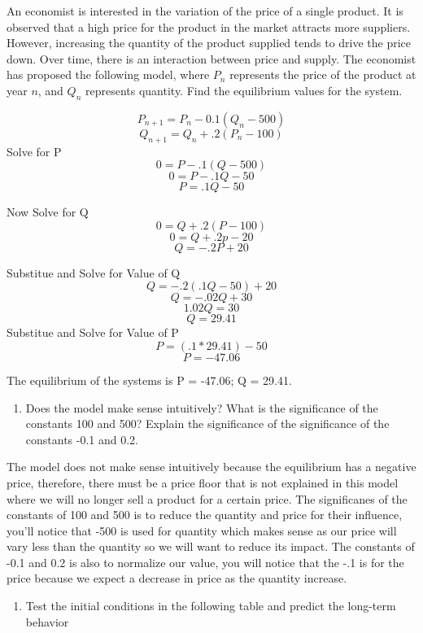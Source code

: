 \documentclass[]{article}
\providecommand{\tightlist}{%
  \setlength{\itemsep}{0pt}\setlength{\parskip}{0pt}}
\begin{document}
An economist is interested in the variation of the price of a single
product. It is observed that a high price for the product in the market
attracts more suppliers. However, increasing the quantity of the product
supplied tends to drive the price down. Over time, there is an
interaction between price and supply. The economist has proposed the
following model, where \(P_n\) represents the price of the product at
year \(n\), and \(Q_n\) represents quantity. Find the equilibrium values
for the system.

\[P_{n+1} = P_n - 0.1(Q_n -500)\] \[Q_{n+1} = Q_n + .2(P_n - 100)\]
Solve for P \[0 = P-.1(Q - 500)\] \[0 = P-.1Q - 50\] \[P = .1Q -50 \]

Now Solve for Q \[0 = Q + .2(P - 100)\] \[0 = Q +.2p-20\]
\[Q = -.2P+20\]

Substitue and Solve for Value of Q \[Q = -.2(.1Q - 50)+20\]
\[Q = -.02Q + 30\] \[1.02Q = 30\] \[Q = 29.41\] Substitue and Solve for
Value of P \[P = (.1*29.41) -50 \] \[P = -47.06\]

The equilibrium of the systems is P = -47.06; Q = 29.41.

\begin{enumerate}
\def\labelenumi{\alph{enumi}.}
\tightlist
\item
  Does the model make sense intuitively? What is the significance of the
  constants 100 and 500? Explain the significance of the significance of
  the constants -0.1 and 0.2.
\end{enumerate}

The model does not make sense intuitively because the equilibrium has a
negative price, therefore, there must be a price floor that is not
explained in this model where we will no longer sell a product for a
certain price. The significanes of the constants of 100 and 500 is to
reduce the quantity and price for their influence, you'll notice that
-500 is used for quantity which makes sense as our price will vary less
than the quantity so we will want to reduce its impact. The constants of
-0.1 and 0.2 is also to normalize our value, you will notice that the
-.1 is for the price because we expect a decrease in price as the
quantity increase.

\begin{enumerate}
\def\labelenumi{\alph{enumi}.}
\setcounter{enumi}{1}
\tightlist
\item
  Test the initial conditions in the following table and predict the
  long-term behavior
\end{enumerate}
\end{document}
